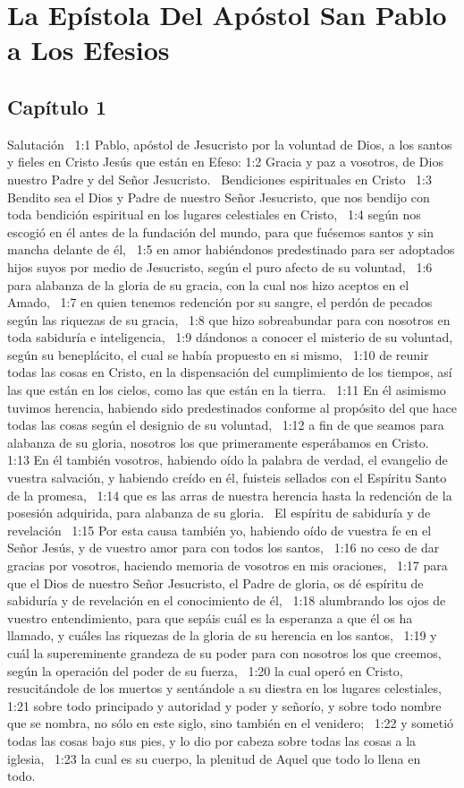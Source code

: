 \chapter{La Epístola Del Apóstol San Pablo a Los  Efesios}

\section*{Capítulo 1 }
Salutación  
1:1 Pablo, apóstol de Jesucristo por la voluntad de Dios, a los santos y fieles en Cristo Jesús que están en Efeso: 
1:2 Gracia y paz a vosotros, de Dios nuestro Padre y del Señor Jesucristo.  
Bendiciones espirituales en Cristo  
1:3 Bendito sea el Dios y Padre de nuestro Señor Jesucristo, que nos bendijo con toda bendición espiritual en los lugares celestiales en Cristo,  
1:4 según nos escogió en él antes de la fundación del mundo, para que fuésemos santos y sin mancha delante de él,  
1:5 en amor habiéndonos predestinado para ser adoptados hijos suyos por medio de Jesucristo, según el puro afecto de su voluntad,  
1:6 para alabanza de la gloria de su gracia, con la cual nos hizo aceptos en el Amado,  
1:7 en quien tenemos redención por su sangre, el perdón de pecados según las riquezas de su gracia,  
1:8 que hizo sobreabundar para con nosotros en toda sabiduría e inteligencia,  
1:9 dándonos a conocer el misterio de su voluntad, según su beneplácito, el cual se había propuesto en si mismo,  
1:10 de reunir todas las cosas en Cristo, en la dispensación del cumplimiento de los tiempos, así las que están en los cielos, como las que están en la tierra.  
1:11 En él asimismo tuvimos herencia, habiendo sido predestinados conforme al propósito del que hace todas las cosas según el designio de su voluntad,  
1:12 a fin de que seamos para alabanza de su gloria, nosotros los que primeramente esperábamos en Cristo.  
1:13 En él también vosotros, habiendo oído la palabra de verdad, el evangelio de vuestra salvación, y habiendo creído en él, fuisteis sellados con el Espíritu Santo de la promesa,  
1:14 que es las arras de nuestra herencia hasta la redención de la posesión adquirida, para alabanza de su gloria.  
El espíritu de sabiduría y de revelación  
1:15 Por esta causa también yo, habiendo oído de vuestra fe en el Señor Jesús, y de vuestro amor para con todos los santos,  
1:16 no ceso de dar gracias por vosotros, haciendo memoria de vosotros en mis oraciones,  
1:17 para que el Dios de nuestro Señor Jesucristo, el Padre de gloria, os dé espíritu de sabiduría y de revelación en el conocimiento de él,  
1:18 alumbrando los ojos de vuestro entendimiento, para que sepáis cuál es la esperanza a que él os ha llamado, y cuáles las riquezas de la gloria de su herencia en los santos,  
1:19 y cuál la supereminente grandeza de su poder para con nosotros los que creemos, según la operación del poder de su fuerza,  
1:20 la cual operó en Cristo, resucitándole de los muertos y sentándole a su diestra en los lugares celestiales,  
1:21 sobre todo principado y autoridad y poder y señorío, y sobre todo nombre que se nombra, no sólo en este siglo, sino también en el venidero;  
1:22 y sometió todas las cosas bajo sus pies, y lo dio por cabeza sobre todas las cosas a la iglesia,  
1:23 la cual es su cuerpo, la plenitud de Aquel que todo lo llena en todo.  
